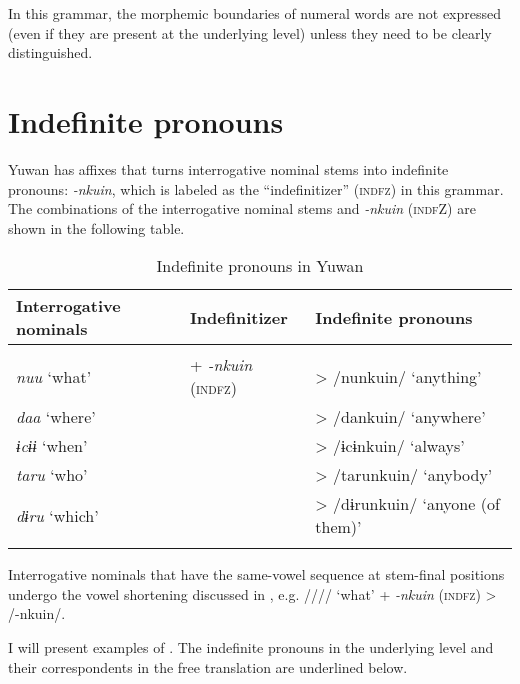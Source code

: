 In this grammar, the morphemic boundaries of numeral words are not expressed (even if they are present at the underlying level) unless they need to be clearly distinguished.

\section{Indefinite pronouns}

Yuwan has affixes that turns interrogative nominal stems into indefinite pronouns: \textit{{}-nkuin}, which is labeled as the “indefinitizer” (\textsc{indfz}) in this grammar. The combinations of the interrogative nominal stems and \textit{-nkuin} (\textsc{indf}Z) are shown in the following table.

\begin{table}
\caption{\label{tab:key:54} Indefinite pronouns in Yuwan}
\begin{tabular}{lll}
\lsptoprule
Interrogative nominals  &   Indefinitizer    & Indefinite pronouns\\
\midrule                                                                                                \\
\textit{nuu}  ‘what’   & +  \textit{{}-nkuin} (\textsc{indfz})&  >  /nunkuin/  ‘anything’               \\
\textit{daa}  ‘where’  &                                      &  >  /dankuin/  ‘anywhere’               \\
\textit{ɨcɨɨ}  ‘when’  &                                      &  >  /ɨcɨnkuin/  ‘always’                \\
\textit{taru}  ‘who’   &                                      & >  /tarunkuin/  ‘anybody’               \\
\textit{dɨru}  ‘which’ &                                      &   >  /dɨrunkuin/  ‘anyone (of them)’    \\
\lspbottomrule
\end{tabular}
\end{table}

Interrogative nominals that have the same-vowel sequence at stem-final positions undergo the vowel shortening discussed in , e.g. //// ‘what’ + \textit{{}-nkuin} (\textsc{indfz}) > /-nkuin/.

  I will present examples of . The indefinite pronouns in the underlying level and their correspondents in the free translation are underlined below.

